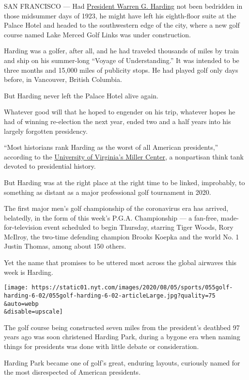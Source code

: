 SAN FRANCISCO --- Had
\href{https://www.whitehouse.gov/about-the-white-house/presidents/warren-g-harding/}{President
Warren G. Harding} not been bedridden in those midsummer days of 1923,
he might have left his eighth-floor suite at the Palace Hotel and headed
to the southwestern edge of the city, where a new golf course named Lake
Merced Golf Links was under construction.

Harding was a golfer, after all, and he had traveled thousands of miles
by train and ship on his summer-long ``Voyage of Understanding.'' It was
intended to be three months and 15,000 miles of publicity stops. He had
played golf only days before, in Vancouver, British Columbia.

But Harding never left the Palace Hotel alive again.

Whatever good will that he hoped to engender on his trip, whatever hopes
he had of winning re-election the next year, ended two and a half years
into his largely forgotten presidency.

``Most historians rank Harding as the worst of all American
presidents,'' according to the
\href{https://millercenter.org/about}{University of Virginia's Miller
Center}, a nonpartisan think tank devoted to presidential history.

But Harding was at the right place at the right time to be linked,
improbably, to something as distant as a major professional golf
tournament in 2020.

The first major men's golf championship of the coronavirus era has
arrived, belatedly, in the form of this week's P.G.A. Championship --- a
fan-free, made-for-television event scheduled to begin Thursday,
starring Tiger Woods, Rory McIlroy, the two-time defending champion
Brooks Koepka and the world No. 1 Justin Thomas, among about 150 others.

Yet the name that promises to be uttered most across the global airwaves
this week is Harding.

\texttt{[image: https://static01.nyt.com/images/2020/08/05/sports/055golf-harding-6-02/055golf-harding-6-02-articleLarge.jpg?quality=75\\\&auto=webp\\\&disable=upscale]}

The golf course being constructed seven miles from the president's
deathbed 97 years ago was soon christened Harding Park, during a bygone
era when naming things for presidents was done with little debate or
consideration.

Harding Park became one of golf's great, enduring layouts, curiously
named for the most disrespected of American presidents.

